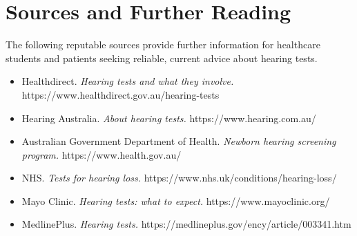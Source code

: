 \section*{Sources and Further Reading}
The following reputable sources provide further information for healthcare students and patients seeking reliable, current advice about hearing tests.

\begin{itemize}
    \item Healthdirect. \textit{Hearing tests and what they involve.} https://www.healthdirect.gov.au/hearing-tests
    \item Hearing Australia. \textit{About hearing tests.} https://www.hearing.com.au/
    \item Australian Government Department of Health. \textit{Newborn hearing screening program.} https://www.health.gov.au/
    \item NHS. \textit{Tests for hearing loss.} https://www.nhs.uk/conditions/hearing-loss/
    \item Mayo Clinic. \textit{Hearing tests: what to expect.} https://www.mayoclinic.org/
    \item MedlinePlus. \textit{Hearing tests.} https://medlineplus.gov/ency/article/003341.htm
\end{itemize}
